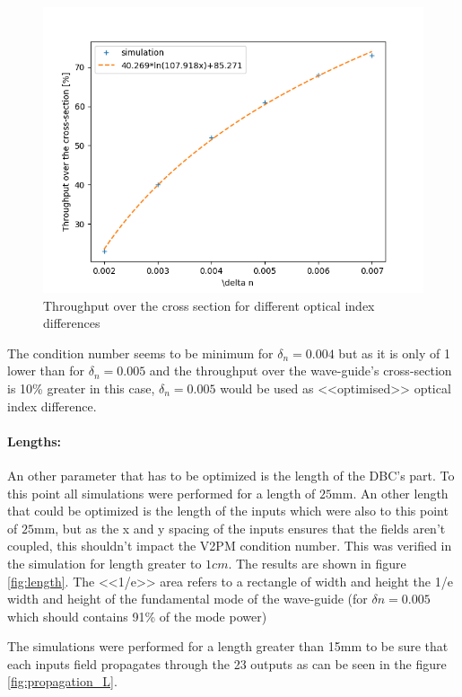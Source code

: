 \begin{figure}[htbp]
  \centering
  \includegraphics[scale=.5]{picture/geometry/throughput_dn.png}
  \caption{Throughput over the cross section for different optical
    index differences}
  \label{fig:throu_dn}
\end{figure}

The condition number seems to be minimum for $\delta_n=0.004$ but as it
is only of 1 lower than for $\delta_n=0.005$ and the throughput over
the wave-guide's cross-section is 10\% greater in this case, $\delta_n=0.005$ would be used as
<<optimised>> optical index difference.

\paragraph{Lengths:}
An other parameter that has to be optimized is the length of the
DBC's part. To this point all simulations were performed for a length
of $25\si{\milli\meter}$. An other length that could be optimized is
the length of the inputs which were also to this point of
$25\si{\milli\meter}$, but as the x and y spacing of the inputs ensures
that the fields aren't coupled, this shouldn't impact the V2PM
condition number. This was verified in the simulation for length
greater to $1cm$.
The results are shown in figure \ref{fig:length}. The <<1/e>> area
refers to a rectangle of width and height the 1/e width and height of
the fundamental mode of the wave-guide (for $\delta n=0.005$ which should contains 91\% of
the mode power)

The simulations were performed for a length greater than 15mm to be
sure that each inputs field propagates through the 23 outputs as can
be seen in the figure \ref{fig:propagation_L}.

